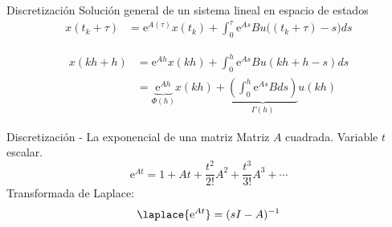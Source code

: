 \documentclass[presentation,aspectratio=1610]{beamer}
\begin{document}
\begin{frame}[label={sec:org67996e0}]{Discretización}
Solución general de un sistema lineal en espacio de estados 
\begin{align*}
x(t_k+\tau)& = \mathrm{e}^{A(\tau)} x(t_k) + \int_{0}^\tau \mathrm{e}^{As} B u\big((t_k+\tau)-s) ds
\end{align*}

\begin{center}
\end{center}

 \begin{align*}
  x(kh+h) &= \mathrm{e}^{Ah} x(kh) + \int_{0}^{h} \mathrm{e}^{As} B u(kh+h-s) ds\\
   &= \underbrace{\mathrm{e}^{Ah}}_{\Phi(h)} x(kh) + \underbrace{\left(\int_{0}^h \mathrm{e}^{As} B ds \right)}_{\Gamma(h)} u(kh)
\end{align*}
\end{frame}

\begin{frame}[label={sec:orgd0597b2}]{Discretización - La exponencial de una matriz}
Matriz \(A\) cuadrada. Variable \(t\) escalar.
\[ \mathrm{e}^{At} = 1 + At + \frac{t^2}{2!}A^2 + \frac{t^3}{3!} A^3 + \cdots\]
Transformada de Laplace:
\[ \laplace{\mathrm{e}^{At}} = (sI - A)^{-1}\]
\end{frame}
\end{document}
